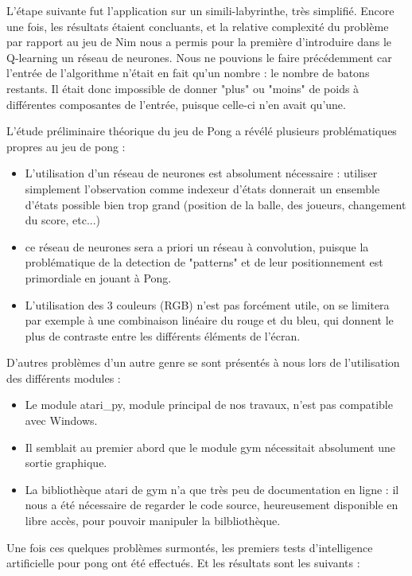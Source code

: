\documentclass[
    10pt,
    a4paper,
    oneside,
    headinclude,footinclude,
    BCOR=5mm,
    captions=tableabove
]{scrartcl}
\begin{document}
L'étape suivante fut l'application sur un simili-labyrinthe, très simplifié. Encore une fois, les résultats étaient concluants, et la relative complexité du problème par rapport au jeu de Nim nous a permis pour la première d'introduire dans le Q-learning un réseau de neurones. Nous ne pouvions le faire précédemment car l'entrée de l'algorithme n'était en fait qu'un nombre : le nombre de batons restants. Il était donc impossible de donner "plus" ou "moins" de poids à différentes composantes de l'entrée, puisque celle-ci n'en avait qu'une.

L'étude préliminaire théorique du jeu de Pong a révélé plusieurs problématiques propres au jeu de pong :
\begin{itemize}
	\item L'utilisation d'un réseau de neurones est absolument nécessaire : utiliser simplement l'observation comme indexeur d'états donnerait un ensemble d'états possible bien trop grand (position de la balle, des joueurs, changement du score, etc...)
	\item ce réseau de neurones sera a priori un réseau à convolution, puisque la problématique de la detection de "patterns" et de leur positionnement est primordiale en jouant à Pong.
	\item L'utilisation des 3 couleurs (RGB) n'est pas forcément utile, on se limitera par exemple à une combinaison linéaire du rouge et du bleu, qui donnent le plus de contraste entre les différents éléments de l'écran.
\end{itemize}

D'autres problèmes d'un autre genre se sont présentés à nous lors de l'utilisation des différents modules :
\begin{itemize}
	\item Le module atari\_py, module principal de nos travaux, n'est pas compatible avec Windows.
	\item Il semblait au premier abord que le module gym nécessitait absolument une sortie graphique.
	\item La bibliothèque atari de gym n'a que très peu de documentation en ligne : il nous a été nécessaire de regarder le code source, heureusement disponible en libre accès, pour pouvoir manipuler la bilbliothèque.
\end{itemize}

	
Une fois ces quelques problèmes surmontés, les premiers tests d'intelligence artificielle pour pong ont été effectués. Et les résultats sont les suivants :
\end{document}
